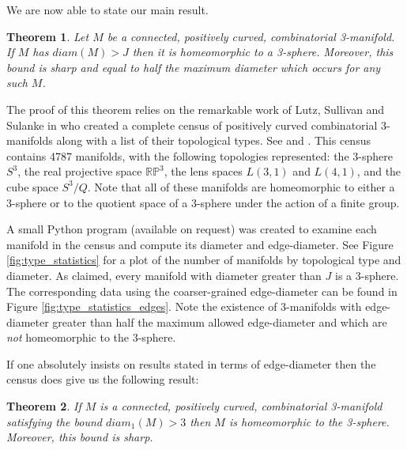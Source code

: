 \documentclass[12pt]{article}
\newtheorem{thm}{Theorem}[section]
\begin{document}
We are now able to state our main result.

\begin{thm} Let $M$ be a connected, positively curved, combinatorial 3-manifold. If $M$ has $diam(M)>J$ then it is homeomorphic to a 3-sphere. Moreover, this bound is sharp and equal to half the maximum diameter which occurs for any such $M$.
\label{thm:discrete_GS}
\end{thm}

\noindent The proof of this theorem relies on the remarkable work of Lutz, Sullivan and Sulanke in \cite{Lutz07, LutzSul_unpub, sulanke2009isomorphism} who created a complete census of positively curved combinatorial 3-manifolds along with a list of their topological types. See \cite{Lutz_online_manifolds} and \cite{Lutz_online_topological_types}. This census contains 4787 manifolds, with the following topologies represented: the 3-sphere $S^3$, the real projective space $\mathbb{RP}^3$, the lens spaces $L(3,1)$ and $L(4,1)$, and the cube space $S^3/Q$. Note that all of these manifolds are homeomorphic to either a 3-sphere or to the quotient space of a 3-sphere under the action of a finite group. 

A small Python program (available on request) was created to examine each manifold in the census and compute its diameter and edge-diameter. See Figure \ref{fig:type_statistics} for a plot of the number of manifolds by topological type and diameter. As claimed, every manifold with diameter greater than $J$ is a 3-sphere. The corresponding data using the coarser-grained edge-diameter can be found in Figure \ref{fig:type_statistics_edges}. Note the existence of $3$-manifolds with edge-diameter greater than half the maximum allowed edge-diameter and which are {\em not} homeomorphic to the 3-sphere.

If one absolutely insists on results stated in terms of edge-diameter then the census does give us the following result:

\begin{thm} If $M$ is a connected, positively curved, combinatorial 3-manifold satisfying the bound $diam_1(M) > 3$ then $M$ is homeomorphic to the 3-sphere. Moreover, this bound is sharp.
\end{thm}
\end{document}
